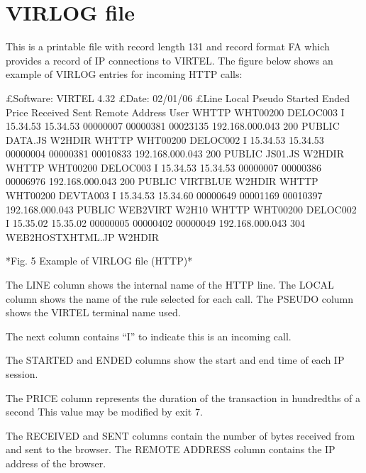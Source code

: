 \documentclass[letterpaper,10pt,english]{sphinxmanual}
\begin{document}

\ignorespaces 

\section{VIRLOG file}
\label{\detokenize{audit_operations_ and_performance:virlog-file}}\label{\detokenize{audit_operations_ and_performance:index-75}}
This is a printable file with record length 131 and record format FA which provides a record of IP connections to VIRTEL. The figure below shows an example of VIRLOG entries for incoming
HTTP calls:

\begin{sphinxVerbatim}[commandchars=\\\{\}]
£Software: VIRTEL 4.32
£Date: 02/01/06
£Line Local Pseudo Started Ended Price Received Sent Remote Address User
W\PYGZhy{}HTTP WHT00200 DELOC003 I 15.34.53 15.34.53 00000007 00000381 00023135 192.168.000.043 200 PUBLIC DATA.JS W2H\PYGZhy{}DIR
W\PYGZhy{}HTTP WHT00200 DELOC002 I 15.34.53 15.34.53 00000004 00000381 00010833 192.168.000.043 200 PUBLIC JS01.JS W2H\PYGZhy{}DIR
W\PYGZhy{}HTTP WHT00200 DELOC003 I 15.34.53 15.34.53 00000007 00000386 00006976 192.168.000.043 200 PUBLIC VIRTBLUE W2H\PYGZhy{}DIR
W\PYGZhy{}HTTP WHT00200 DEVTA003 I 15.34.53 15.34.60 00000649 00001169 00010397 192.168.000.043 PUBLIC WEB2VIRT W2H\PYGZhy{}10
W\PYGZhy{}HTTP WHT00200 DELOC002 I 15.35.02 15.35.02 00000005 00000402 00000049 192.168.000.043 304 WEB2HOSTXHTML.JP W2H\PYGZhy{}DIR

*Fig. 5 Example of VIRLOG file (HTTP)*
\end{sphinxVerbatim}

The LINE column shows the internal name of the HTTP line.
The LOCAL column shows the name of the rule selected for each call.
The PSEUDO column shows the VIRTEL terminal name used.

The next column contains “I” to indicate this is an incoming call.

The STARTED and ENDED columns show the start and end time of each IP session.

The PRICE column represents the duration of the transaction in hundredths of a second This value may be modified by exit 7.

The RECEIVED and SENT columns contain the number of bytes received from and sent to the browser. The REMOTE ADDRESS column contains the IP address of the browser.
\end{document}
